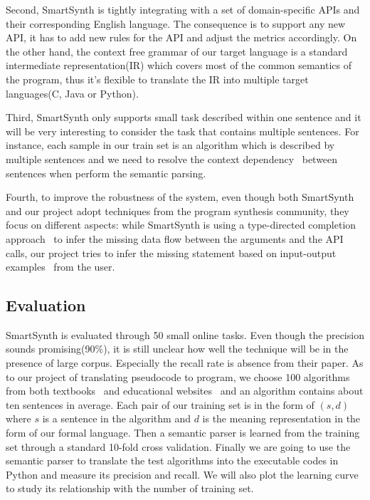 \documentclass[10pt]{article}
\begin{document}
Second, SmartSynth is tightly integrating with a set of domain-specific APIs and their
corresponding English language. The consequence is to support any new API, it has to 
add new rules for the API and adjust the metrics accordingly. On the other hand, the 
context free grammar of our target language is a standard intermediate 
representation(IR) which covers most of the common semantics of the program, thus it's 
flexible to translate the IR into multiple target languages(C, Java or Python).

Third, SmartSynth only supports small task described within one 
sentence and it will be very interesting to consider the task that contains multiple 
sentences. For instance, each sample in our train set is an algorithm which is
described by multiple sentences and we need to resolve the context 
dependency~\cite{dep} between sentences when perform the semantic parsing.

Fourth, to improve the robustness of the system, even though both SmartSynth 
and our project adopt techniques from the program synthesis community, 
they focus on different aspects: while SmartSynth is using a type-directed 
completion approach~\cite{typebase} to infer the missing data flow between
the arguments and the API calls, our project tries to infer the missing 
statement based on input-output examples~\cite{input} from the user.
\subsection{Evaluation}
SmartSynth is evaluated through 50 small online tasks. Even though 
the precision sounds promising(90\%), it is still unclear how well the 
technique will be in the presence of large corpus. Especially the recall
rate is absence from their paper. As to our project of translating pseudocode to 
program, we choose 100 algorithms from both textbooks~\cite{taocp} and educational websites~\cite{codebat} and an algorithm contains about ten sentences in average. Each
pair of our training set is in the form of $(s,d)$ where $s$ is 
a sentence in the algorithm and $d$ is the meaning representation in the form 
of our formal language. Then a semantic parser is learned from the training
set through a standard 10-fold cross validation. Finally we are going to 
use the semantic parser to translate the test algorithms into the executable
codes in Python and measure its precision and recall. 
We will also plot the learning curve to study its relationship with 
the number of training set.  
\end{document}
